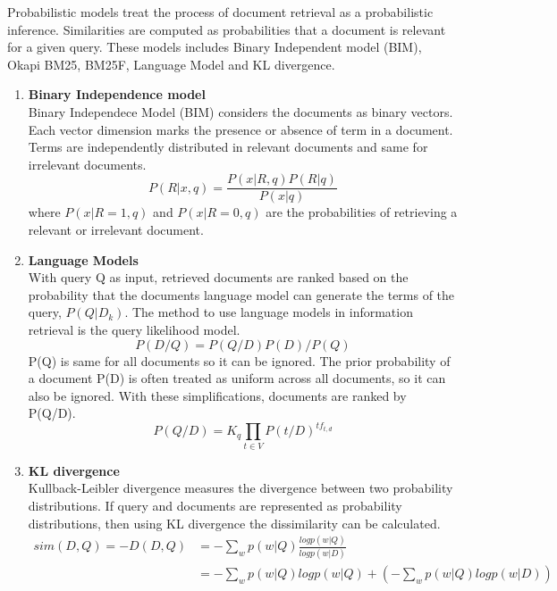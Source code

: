 Probabilistic models treat the process of document retrieval as a probabilistic inference. Similarities are computed as probabilities that a document is relevant for a given query. These models includes Binary Independent model (BIM), Okapi BM25, BM25F, Language Model and KL divergence. %
\begin{enumerate}
\item{\textbf{Binary Independence model}}\\
Binary Independece Model (BIM) considers the documents as binary vectors. Each vector dimension marks the presence or absence of term in a document. Terms are independently distributed in relevant documents and same for irrelevant documents.
\begin{equation}
P(R|x,q) = \frac{P(x|R,q) P(R|q)}{P(x|q)}
\end{equation}
where $P(x|R=1,q)$ and $P(x|R=0,q)$ are the probabilities of retrieving a relevant or irrelevant document. 

\item{\textbf{Language Models}}\\
With query Q as input, retrieved documents are ranked based on the probability that the documents language model can generate the terms of the query, $P(Q|D_k)$. The method to use language models in information retrieval is the query likelihood model.
\begin{equation}
P(D/Q) = P(Q/D) P(D) / P(Q) 
\end{equation}
P(Q) is same for all documents so it can be ignored. The prior probability of a document P(D) is often treated as uniform across all documents, so it can also be ignored. With these simplifications, documents are ranked by P(Q/D).
\begin{equation}
P(Q/D) = K_q \prod_{t \in V}{ P(t/D)^{tf_{t,d}}}
\end{equation}
\item{\textbf{KL divergence}}\\
Kullback-Leibler divergence measures the divergence between two probability distributions. If query and documents are represented as probability distributions, then using KL divergence the dissimilarity can be calculated. 
\begin{equation}
\begin{split}
sim(D,Q) = - D (D,Q) &= - \sum_w p(w|Q) \frac{log p(w|Q)}{log p(w|D)} \\
		  			 &= - \sum_w p(w|Q) log p(w|Q) + (- \sum_w p(w|Q) log p(w|D))\\
\end{split}		 
\end{equation}

\end{enumerate}


